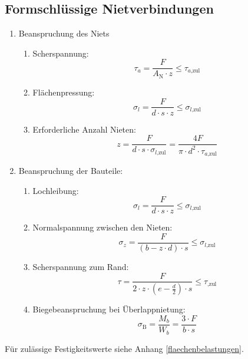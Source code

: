 	\subsection{Formschlüssige Nietverbindungen} %
		\begin{enumerate}
		\item Beanspruchung des Niets
			\begin{enumerate}
				\item Scherspannung:
					\begin{equation*}
						\tau_a = \frac{F}{A_{\text{N}}\cdot z} \leq \tau_{a\text{,zul}}
					\end{equation*}
				\item Flächenpressung:
					\begin{equation*}
						\sigma_l = \frac{F}{d \cdot s \cdot z} \leq \sigma_{l\text{,zul}}
					\end{equation*}
				\item Erforderliche Anzahl Nieten:
					\begin{equation*}
						z = \frac{F}{d \cdot s \cdot \sigma_{l\text{,zul}}} = \frac{4F}{\pi \cdot d^2 \cdot \tau_{a\text{,zul}}}
					\end{equation*}
			\end{enumerate}
		\item Beanspruchung der Bauteile:
			\begin{enumerate}
				\item Lochleibung:
					\begin{equation*}
						\sigma_l = \frac{F}{d \cdot s \cdot z} \leq \sigma_{l\text{,zul}}
					\end{equation*}
				\item Normalspannung zwischen den Nieten:
					\begin{equation*}
						\sigma_z = \frac{F}{(b-z\cdot d)\cdot s} \leq \sigma_{l\text{,zul}}
					\end{equation*}
				\item Scherspannung zum Rand:
					\begin{equation*}
						\tau = \frac{F}{2\cdot z \cdot \left( e-\frac{d}{2}\right)\cdot s} \leq \tau_{\text{,zul}}
					\end{equation*}
				\item Biegebeanspruchung bei Überlappnietung:
					\begin{equation*}
						\sigma_{\text{B}} = \frac{M_b}{W_b} = \frac{3\cdot F}{b \cdot s}
					\end{equation*}
			\end{enumerate}
		\end{enumerate}
		Für zulässige Festigkeitswerte siehe Anhang \ref{flaechenbelastungen}.
